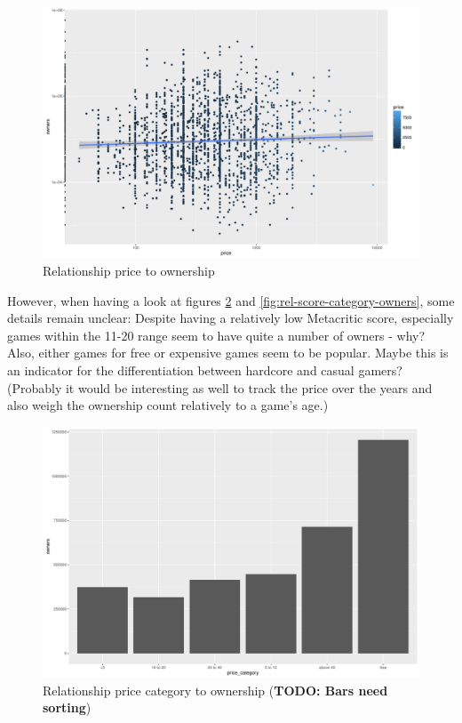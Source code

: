 \begin{figure}[!t]
	\centering
	\includegraphics[width=1.0\columnwidth]{images/rel-price-owners.pdf}
	\caption{Relationship price to ownership}
\label{fig:rel-price-owners}
\end{figure}

However, when having a look at figures \ref{fig:rel-price-category-owners} and \ref{fig:rel-score-category-owners}, some details remain unclear: Despite having a relatively low Metacritic score, especially games within the 11-20 range seem to have quite a number of owners - why? Also, either games for free or expensive games seem to be popular. Maybe this is an indicator for the differentiation between hardcore and casual gamers? (Probably it would be interesting as well to track the price over the years and also weigh the ownership count relatively to a game's age.)

\begin{figure}[!t]
	\centering
	\includegraphics[width=1.0\columnwidth]{images/rel-price-category-owners.pdf}
	\caption{Relationship price category to ownership (\textbf{TODO: Bars need sorting})}
\label{fig:rel-price-category-owners}
\end{figure}

